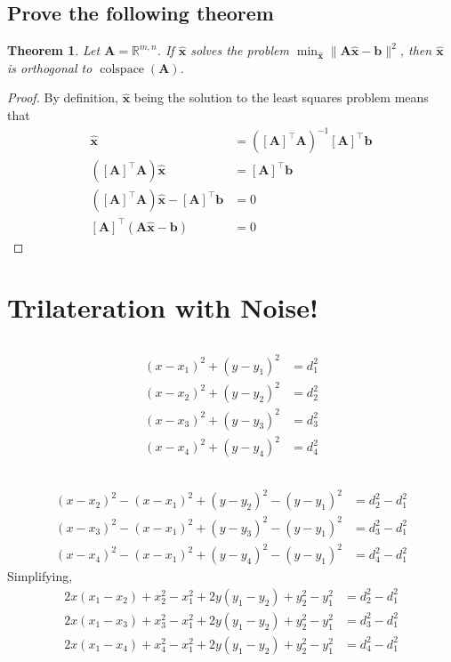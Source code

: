 \documentclass[]{article}
\newtheorem{genthm}{Theorem}
\renewcommand{\vec}[1]{\bm{#1}}
\newcommand{\unit}[1]{\vec{\hat{#1}}}
\newcommand{\tpose}[1]{\left[#1\right]^{\! \top}}
\begin{document}
\subsection{Prove the following theorem}

\begin{genthm}
	Let \(\vec{A} = \mathbb{R}^{m, n}\). 
	If \(\unit{x}\) solves the problem \(\min_{\unit{x}}\|\vec{A} \unit{x} - \vec{b}\|^2\), then \(\unit{x}\) is orthogonal to \(\operatorname{colspace}(\vec{A})\). 
\end{genthm}

\begin{proof}
By definition, \(\unit{x}\) being the solution to the least squares problem means that 
\begin{align}
	\unit{x} &= (\tpose{\vec{A}} \vec{A})^{-1} \tpose{\vec{A}} \vec{b} \\
	(\tpose{\vec{A}} \vec{A}) \unit{x} &= \tpose{\vec{A}} \vec{b} \\
	(\tpose{\vec{A}} \vec{A}) \unit{x} - \tpose{\vec{A}} \vec{b} &= 0 \\
	\tpose{\vec{A}} (\vec{A} \unit{x} - \vec{b}) &= 0
\end{align}
\end{proof}

\section{Trilateration with Noise!}

\subsection{}

\begin{align}
	(x - x_1)^2 + (y - y_1)^2 &= d_1^2 \\
	(x - x_2)^2 + (y - y_2)^2 &= d_2^2 \\
	(x - x_3)^2 + (y - y_3)^2 &= d_3^2 \\
	(x - x_4)^2 + (y - y_4)^2 &= d_4^2
\end{align}

\subsection{}

\begin{align}
	(x - x_2)^2 - (x - x_1)^2 + (y - y_2)^2 - (y - y_1)^2 &= d_2^2 - d_1^2 \\
	(x - x_3)^2 - (x - x_1)^2 + (y - y_3)^2 - (y - y_1)^2 &= d_3^2 - d_1^2 \\
	(x - x_4)^2 - (x - x_1)^2 + (y - y_4)^2 - (y - y_1)^2 &= d_4^2 - d_1^2
\end{align}
Simplifying, 
\begin{align}
	2x(x_1 - x_2) + x_2^2 - x_1^2 + 2y(y_1 - y_2) + y_2^2 - y_1^2&= d_2^2 - d_1^2 \\
	2x(x_1 - x_3) + x_3^2 - x_1^2 + 2y(y_1 - y_2) + y_2^2 - y_1^2&= d_3^2 - d_1^2 \\
	2x(x_1 - x_4) + x_4^2 - x_1^2 + 2y(y_1 - y_2) + y_2^2 - y_1^2&= d_4^2 - d_1^2
\end{align}
\end{document}
